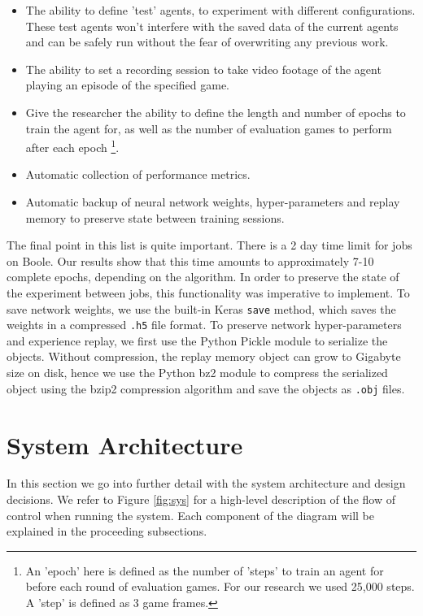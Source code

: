 \begin{itemize}
	\item The ability to define 'test' agents, to experiment with different configurations. These test agents won't interfere with the saved data of the current agents and can be safely run without the fear of overwriting any previous work.
	\item The ability to set a recording session to take video footage of the agent playing an episode of the specified game.
	\item Give the researcher the ability to define the length and number of epochs to train the agent for, as well as the number of evaluation games to perform after each epoch \footnote{An 'epoch' here is defined as the number of 'steps' to train an agent for before each round of evaluation games. For our research we used 25,000 steps. A 'step' is defined as 3 game frames.}.
	\item Automatic collection of performance metrics.
	\item Automatic backup of neural network weights, hyper-parameters and replay memory to preserve state between training sessions.
\end{itemize}

The final point in this list is quite important. There is a 2 day time limit for jobs on Boole. Our results show that this time amounts to approximately 7-10 complete epochs, depending on the algorithm. In order to preserve the state of the experiment between jobs, this functionality was imperative to implement. To save network weights, we use the built-in Keras \texttt{save} method, which saves the weights in a compressed \texttt{.h5} file format. To preserve network hyper-parameters and experience replay, we first use the Python Pickle module \cite{pickle} to serialize the objects. Without compression, the replay memory object can grow to Gigabyte size on disk, hence we use the Python bz2 module \cite{bz2} to compress the serialized object using the bzip2 compression algorithm and save the objects as \texttt{.obj} files.

\section{System Architecture}
In this section we go into further detail with the system architecture and design decisions. We refer to Figure \ref{fig:sys} for a high-level description of the flow of control when running the system. Each component of the diagram will be explained in the proceeding subsections.

